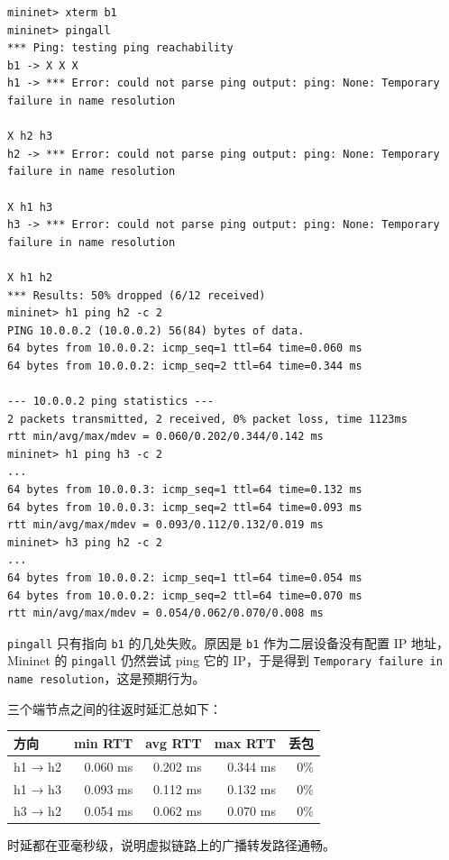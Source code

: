 \documentclass[UTF8,12pt,a4paper,fontset=fandol]{ctexart}
\begin{document}
\begin{verbatim}
mininet> xterm b1
mininet> pingall
*** Ping: testing ping reachability
b1 -> X X X 
h1 -> *** Error: could not parse ping output: ping: None: Temporary failure in name resolution

X h2 h3 
h2 -> *** Error: could not parse ping output: ping: None: Temporary failure in name resolution

X h1 h3 
h3 -> *** Error: could not parse ping output: ping: None: Temporary failure in name resolution

X h1 h2 
*** Results: 50% dropped (6/12 received)
mininet> h1 ping h2 -c 2
PING 10.0.0.2 (10.0.0.2) 56(84) bytes of data.
64 bytes from 10.0.0.2: icmp_seq=1 ttl=64 time=0.060 ms
64 bytes from 10.0.0.2: icmp_seq=2 ttl=64 time=0.344 ms

--- 10.0.0.2 ping statistics ---
2 packets transmitted, 2 received, 0% packet loss, time 1123ms
rtt min/avg/max/mdev = 0.060/0.202/0.344/0.142 ms
mininet> h1 ping h3 -c 2
...
64 bytes from 10.0.0.3: icmp_seq=1 ttl=64 time=0.132 ms
64 bytes from 10.0.0.3: icmp_seq=2 ttl=64 time=0.093 ms
rtt min/avg/max/mdev = 0.093/0.112/0.132/0.019 ms
mininet> h3 ping h2 -c 2
...
64 bytes from 10.0.0.2: icmp_seq=1 ttl=64 time=0.054 ms
64 bytes from 10.0.0.2: icmp_seq=2 ttl=64 time=0.070 ms
rtt min/avg/max/mdev = 0.054/0.062/0.070/0.008 ms
\end{verbatim}

\texttt{pingall} 只有指向 \texttt{b1} 的几处失败。原因是 \texttt{b1} 作为二层设备没有配置 IP 地址，Mininet 的 \texttt{pingall} 仍然尝试 ping 它的 IP，于是得到 \texttt{Temporary failure in name resolution}，这是预期行为。

三个端节点之间的往返时延汇总如下：

\begin{center}
{\small
\begin{tabular}{@{}lrrrr@{}}
\toprule
\rowcolor{TableHeader}\textbf{方向} & \textbf{min RTT} & \textbf{avg RTT} & \textbf{max RTT} & \textbf{丢包}\\
\midrule
h1 → h2 & 0.060 ms & 0.202 ms & 0.344 ms & 0\%\\
h1 → h3 & 0.093 ms & 0.112 ms & 0.132 ms & 0\%\\
h3 → h2 & 0.054 ms & 0.062 ms & 0.070 ms & 0\%\\
\bottomrule
\end{tabular}}
\end{center}

时延都在亚毫秒级，说明虚拟链路上的广播转发路径通畅。
\end{document}
